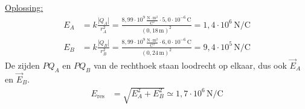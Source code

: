 \documentclass{ximera}
\begin{document}
\begin{exercise}
\begin{solution}
        \underline{Oplossing:}\\
        \begin{align*}
            E_{A} &= k \frac{|Q_{A}|}{r_{A}^{2}} = \frac{8{,}99 \cdot 10^{9} \, \mathrm{\frac{N \cdot m^2}{C^2}} \cdot 5{,}0 \cdot 10^{-6} \, \mathrm{C}}{(0{,}18 \, \mathrm{m})^{2}} = 1{,}4 \cdot 10^{6} \, \mathrm{N/C} \\
            E_{B} &= k \frac{|Q_{B}|}{r_{B}^{2}} = \frac{8{,}99 \cdot 10^{9} \, \mathrm{\frac{N \cdot m^2}{C^2}} \cdot 6{,}0 \cdot 10^{-6} \, \mathrm{C}}{(0{,}24 \, \mathrm{m})^{2}} = 9{,}4 \cdot 10^{5} \, \mathrm{N/C}
        \end{align*}
        De zijden $PQ_A$ en $PQ_B$ van de rechthoek staan loodrecht op elkaar, dus ook $\vec{E}_A$ en $\vec{E}_B$.
        \begin{align*}
            E_{\text{res}} &= \sqrt{E_A^{2} + E_B^{2}} \simeq \boxed{1{,}7 \cdot 10^{6} \, \mathrm{N/C}}
        \end{align*}
    \end{solution}
\end{exercise}
\end{document}

